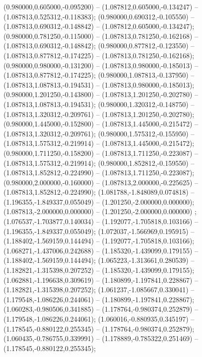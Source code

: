  (0.980000,0.605000,-0.095200) -- (1.087812,0.605000,-0.134247) -- (1.087813,0.525312,-0.118383);
 (0.980000,0.690312,-0.105550) -- (1.087813,0.690312,-0.148842) -- (1.087812,0.605000,-0.134247);
 (0.980000,0.781250,-0.115000) -- (1.087813,0.781250,-0.162168) -- (1.087813,0.690312,-0.148842);
 (0.980000,0.877812,-0.123550) -- (1.087813,0.877812,-0.174225) -- (1.087813,0.781250,-0.162168);
 (0.980000,0.980000,-0.131200) -- (1.087813,0.980000,-0.185013) -- (1.087813,0.877812,-0.174225);
 (0.980000,1.087813,-0.137950) -- (1.087813,1.087813,-0.194531) -- (1.087813,0.980000,-0.185013);
 (0.980000,1.201250,-0.143800) -- (1.087813,1.201250,-0.202780) -- (1.087813,1.087813,-0.194531);
 (0.980000,1.320312,-0.148750) -- (1.087813,1.320312,-0.209761) -- (1.087813,1.201250,-0.202780);
 (0.980000,1.445000,-0.152800) -- (1.087813,1.445000,-0.215472) -- (1.087813,1.320312,-0.209761);
 (0.980000,1.575312,-0.155950) -- (1.087813,1.575312,-0.219914) -- (1.087813,1.445000,-0.215472);
 (0.980000,1.711250,-0.158200) -- (1.087813,1.711250,-0.223087) -- (1.087813,1.575312,-0.219914);
 (0.980000,1.852812,-0.159550) -- (1.087813,1.852812,-0.224990) -- (1.087813,1.711250,-0.223087);
 (0.980000,2.000000,-0.160000) -- (1.087813,2.000000,-0.225625) -- (1.087813,1.852812,-0.224990);
 (1.081788,-1.848089,0.074818) -- (1.196355,-1.849337,0.055049) -- (1.201250,-2.000000,0.000000);
 (1.087813,-2.000000,0.000000) -- (1.201250,-2.000000,0.000000) ;
 (1.076537,-1.703877,0.140034) -- (1.192077,-1.705818,0.103166) -- (1.196355,-1.849337,0.055049);
 (1.072037,-1.566969,0.195915) -- (1.188402,-1.569159,0.144494) -- (1.192077,-1.705818,0.103166);
 (1.068271,-1.437006,0.242688) -- (1.185320,-1.439099,0.179155) -- (1.188402,-1.569159,0.144494);
 (1.065223,-1.313661,0.280539) -- (1.182821,-1.315398,0.207252) -- (1.185320,-1.439099,0.179155);
 (1.062881,-1.196638,0.309619) -- (1.180899,-1.197841,0.228867) -- (1.182821,-1.315398,0.207252);
 (1.061237,-1.085667,0.330041) -- (1.179548,-1.086226,0.244061) -- (1.180899,-1.197841,0.228867);
 (1.060283,-0.980506,0.341885) -- (1.178764,-0.980374,0.252879) -- (1.179548,-1.086226,0.244061);
 (1.060016,-0.880935,0.345197) -- (1.178545,-0.880122,0.255345) -- (1.178764,-0.980374,0.252879);
 (1.060435,-0.786755,0.339991) -- (1.178889,-0.785322,0.251469) -- (1.178545,-0.880122,0.255345);

